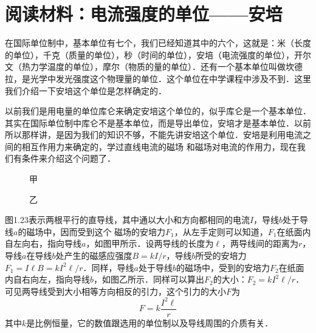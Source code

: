 \section*{阅读材料：电流强度的单位——安培}
在国际单位制中，基本单位有七个，我们已经知道其中的六个，这就是：米（长度的单位），千克（质量的单位），秒（时间的单位），安培（电流强度的单位），开尔文（热力学温度的单位），摩尔（物质的量的单位）．还有一个基本单位叫做坎德拉，是光学中发光强度这个物理量的单位．这个单位在中学课程中涉及不到．这里我们介绍一下安培这个单位是怎样确定的．

以前我们是用电量的单位库仑来确定安培这个单位的，似乎库仑是一个基本单位．其实在国际单位制中库仑不是基本单位，而是导出单位，安培才是基本单位．以前所以那样讲，是因为我们的知识不够，不能先讲安培这个单位．安培是利用电流之间的相互作用力来确定的，学过直线电流的磁场
和磁场对电流的作用力，现在我们有条件来介绍这个问题了．
\begin{figure}[htp]
\centering
\begin{minipage}[t]{0.48\textwidth}
\centering
{}
\caption*{甲}
\end{minipage}
\begin{minipage}[t]{0.48\textwidth}
\centering
{}
\caption*{乙}
\end{minipage}
\caption{}
\end{figure}

图1.23表示两根平行的直导线，其中通以大小和方向都相同的电流$I$，导线$b$处于导线$a$的磁场中，因而受到这个
磁场的安培力$F_1$，从左手定则可以知道，$F_1$在纸面内自左向右，指向导线$a$，如图甲所示．设两导线的长度为$\ell$，两导线间的距离为$r$，导线$a$在导线$b$处产生的磁感应强度$B=kI/r$，导线$b$所受的安培力$F_1=I\ell B=kI^2\ell/r$．同样，导线$a$处于导线$b$的磁场中，受到的安培力$F_2$在纸面内自右向左，指向导线$b$，如图乙所示．同样可以算出$F_2$的大小：$F_2=kI^2\ell/r$．可见两导线受到大小相等方向相反的引力，这个引力的大小$F$为
\[F=k\frac{I^2\ell}{r}\]
其中$k$是比例恒量，它的数值跟选用的单位制以及导线周围的介质有关．

